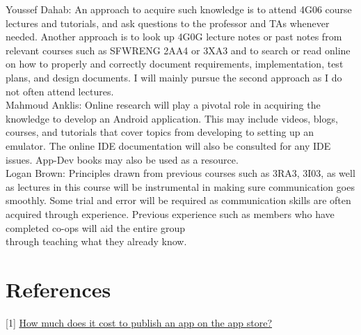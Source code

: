 \documentclass[12pt,letterpaper]{article}
\begin{document}
\noindent Youssef Dahab: An approach to acquire such knowledge is to attend 4G06 course lectures and tutorials, and ask questions to the professor and TAs whenever needed. Another approach is to look up 4G0G lecture notes or past notes from relevant courses such as SFWRENG 2AA4 or 3XA3 and to search or read online on how to properly and correctly document requirements, implementation, test plans, and design documents. I will mainly pursue the second approach as I do not often attend lectures.\\

\noindent Mahmoud Anklis: Online research will play a pivotal role in acquiring the knowledge to develop an Android application. This may include videos, blogs, courses, and tutorials that cover topics from developing to setting up an emulator. The online IDE documentation will also be consulted for any IDE issues. App-Dev books may also be used as a resource.\\  

\noindent Logan Brown: Principles drawn from previous courses such as 3RA3, 3I03, as well as lectures in this course will be instrumental in making sure communication goes smoothly. Some trial and error will be required as communication skills are often acquired through experience. Previous experience such as members who have completed co-ops will aid the entire group\\ through teaching what they already know.

\newpage 

\section{References}
[1] \href{https://www.appypie.com/faqs/how-much-does-it-cost-to-publish-an-app-on-the-app-store}{\color{blue}How much does it cost to publish an app on the app store?}
\end{document}
